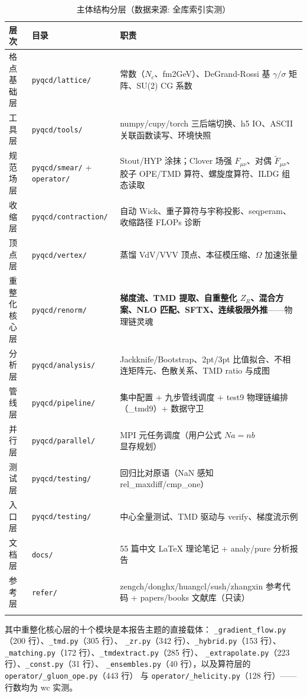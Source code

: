 \documentclass[UTF8]{ctexart}
\begin{document}
\begin{xltabular}{\textwidth}{llX}
\toprule
\textcolor{struct}{层次} & 目录 & 职责 \\
\midrule
\endhead
格点基础层 & \texttt{pyqcd/lattice/} & 常数（$N_c$、fm2GeV）、DeGrand-Rossi 基 $\gamma/\sigma$ 矩阵、SU(2) CG 系数 \\
工具层 & \texttt{pyqcd/tools/} & numpy/cupy/torch 三后端切换、h5 IO、ASCII 关联函数读写、环境快照 \\
规范场层 & \texttt{pyqcd/smear/} + \texttt{operator/} & Stout/HYP 涂抹；Clover 场强 $F_{\mu\nu}$、对偶 $\tilde F_{\mu\nu}$、胶子 OPE/TMD 算符、螺旋度算符、ILDG 组态读取 \\
收缩层 & \texttt{pyqcd/contraction/} & 自动 Wick、重子算符与宇称投影、seqperam、收缩路径 FLOPs 诊断 \\
顶点层 & \texttt{pyqcd/vertex/} & 蒸馏 VdV/VVV 顶点、本征模压缩、$\Omega$ 加速张量 \\
\textcolor{struct}{重整化核心层} & \texttt{pyqcd/renorm/} & \textbf{梯度流、TMD 提取、自重整化 $Z_R$、混合方案、NLO 匹配、SFTX、连续极限外推}——物理链灵魂 \\
分析层 & \texttt{pyqcd/analysis/} & Jackknife/Bootstrap、2pt/3pt 比值拟合、不相连矩阵元、色散关系、TMD ratio 与成图 \\
管线层 & \texttt{pyqcd/pipeline/} & 集中配置 + 九步管线调度 + test9 物理链编排（\_tmd9）+ 数据守卫 \\
并行层 & \texttt{pyqcd/parallel/} & MPI 元任务调度（用户公式 $N a = n b$ 显存规划） \\
测试层 & \texttt{pyqcd/testing/} & 回归比对原语（NaN 感知 rel\_maxdiff/cmp\_one） \\
入口层 & \texttt{pyqcd/testing/} & 中心全量测试、TMD 驱动与 verify、梯度流示例 \\
文档层 & \texttt{docs/} & 55 篇中文 LaTeX 理论笔记 + analy/pure 分析报告 \\
参考层 & \texttt{refer/} & zengch/donghx/huangcl/sush/zhangxin 参考代码 + papers/books 文献库（只读） \\
\bottomrule
\caption{主体结构分层（数据来源: 全库索引实测）}
\end{xltabular}

其中重整化核心层的十个模块是本报告主题的直接载体：
\texttt{\_gradient\_flow.py}（200 行）、\texttt{\_tmd.py}（305 行）、
\texttt{\_zr.py}（342 行）、\texttt{\_hybrid.py}（153 行）、
\texttt{\_matching.py}（172 行）、\texttt{\_tmdextract.py}（285 行）、
\texttt{\_extrapolate.py}（223 行）、\texttt{\_const.py}（31 行）、
\texttt{\_ensembles.py}（40 行），以及算符层的 \texttt{operator/\_gluon\_ope.py}（443 行）
与 \texttt{operator/\_helicity.py}（128 行）——行数均为 wc 实测。
\end{document}
